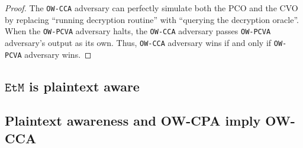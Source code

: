 \documentclass{article}
\newcommand{\monospace}{\texttt}
\newcommand{\etm}{\monospace{EtM}}  %
\begin{document}
\begin{proof}
    The \monospace{OW-CCA} adversary can perfectly simulate both the PCO and the CVO by replacing ``running decryption routine'' with ``querying the decryption oracle''. When the \monospace{OW-PCVA} adversary halts, the \monospace{OW-CCA} adversary passes \monospace{OW-PCVA} adversary's output as its own. Thus, \monospace{OW-CCA} adversary wins if and only if \monospace{OW-PCVA} adversary wins.
\end{proof}

\subsection{$\etm$ is plaintext aware}\label{sec:etm-is-pa}

\subsection{Plaintext awareness and OW-CPA imply OW-CCA}\label{sec:pa-and-owcpa-imply-owcca}



\end{document}
